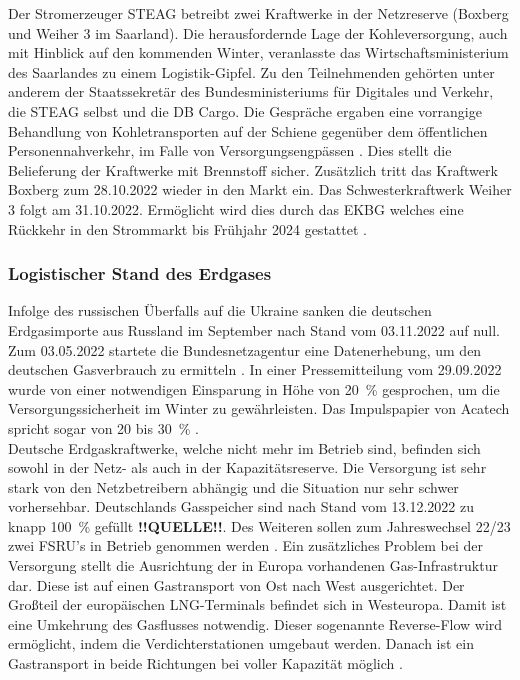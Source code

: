 			Der Stromerzeuger STEAG betreibt zwei Kraftwerke in der Netzreserve (Boxberg und Weiher 3 im Saarland). 
			Die herausfordernde Lage der Kohleversorgung, auch mit Hinblick auf den kommenden Winter, veranlasste das Wirtschaftsministerium des Saarlandes zu einem Logistik-Gipfel. 
			Zu den Teilnehmenden gehörten unter anderem der Staatssekretär des Bundesministeriums für Digitales und Verkehr, die STEAG selbst und die DB Cargo. 
			Die Gespräche ergaben eine vorrangige Behandlung von Kohletransporten auf der Schiene gegenüber dem öffentlichen Personennahverkehr, im Falle von Versorgungsengpässen \cite{Logistikgipfel_Saarland}. 
			Dies stellt die Belieferung der Kraftwerke mit Brennstoff sicher. 
			Zusätzlich tritt das Kraftwerk Boxberg zum 28.10.2022 wieder in den Markt ein. 
			Das Schwesterkraftwerk Weiher 3 folgt am 31.10.2022. 
			Ermöglicht wird dies durch das EKBG welches eine Rückkehr in den Strommarkt bis Frühjahr 2024 gestattet \cite{STEAG_Steinkohle}. 
	
	
		\subsubsection{Logistischer Stand des Erdgases}
		
			Infolge des russischen Überfalls auf die Ukraine sanken die deutschen Erdgasimporte aus Russland im September nach Stand vom 03.11.2022 auf null. 
			Zum 03.05.2022 startete die Bundesnetzagentur eine Datenerhebung, um den deutschen Gasverbrauch zu ermitteln \cite{Datenerhebung_Gas}. 
			In einer Pressemitteilung vom 29.09.2022 wurde von einer notwendigen Einsparung in Höhe von \SI{20}{\percent} gesprochen, um die Versorgungssicherheit im Winter zu gewährleisten.
			Das Impulspapier von Acatech spricht sogar von 20 bis \SI{30}{\percent} \cite{Impuls_Acatech_Einsparung}. \\
			
			Deutsche Erdgaskraftwerke, welche nicht mehr im Betrieb sind, befinden sich sowohl in der Netz- als auch in der Kapazitätsreserve. 
			Die Versorgung ist sehr stark von den Netzbetreibern abhängig und die Situation nur sehr schwer vorhersehbar. 
			Deutschlands Gasspeicher sind nach Stand vom 13.12.2022 zu knapp \SI{100}{\percent} gefüllt \textbf{!!QUELLE!!}. 
			Des Weiteren sollen zum Jahreswechsel 22/23 zwei FSRU's in Betrieb genommen werden \cite{LNG_FSRU}.
			Ein zusätzliches Problem bei der Versorgung stellt die Ausrichtung der in Europa vorhandenen Gas-Infrastruktur dar. 
			Diese ist auf einen Gastransport von Ost nach West ausgerichtet. 
			Der Großteil der europäischen LNG-Terminals befindet sich in Westeuropa. 
			Damit ist eine Umkehrung des Gasflusses notwendig. 
			Dieser sogenannte Reverse-Flow wird ermöglicht, indem die Verdichterstationen umgebaut werden. 
			Danach ist ein Gastransport in beide Richtungen bei voller Kapazität möglich \cite{Impuls_Acatech_Reverse_Flow}. \\
			
